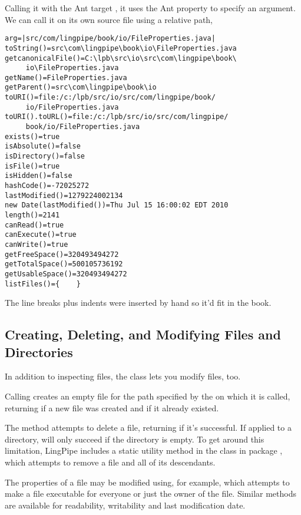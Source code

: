 Calling it with the Ant target , it uses the
 Ant property to specify an argument.  We can call it
on its own source file using a relative path,
%
%
\begin{verbatim}
arg=|src/com/lingpipe/book/io/FileProperties.java|
toString()=src\com\lingpipe\book\io\FileProperties.java
getcanonicalFile()=C:\lpb\src\io\src\com\lingpipe\book\
     io\FileProperties.java
getName()=FileProperties.java
getParent()=src\com\lingpipe\book\io
toURI()=file:/c:/lpb/src/io/src/com/lingpipe/book/
     io/FileProperties.java
toURI().toURL()=file:/c:/lpb/src/io/src/com/lingpipe/
     book/io/FileProperties.java
exists()=true
isAbsolute()=false
isDirectory()=false
isFile()=true
isHidden()=false
hashCode()=-72025272
lastModified()=1279224002134
new Date(lastModified())=Thu Jul 15 16:00:02 EDT 2010
length()=2141
canRead()=true
canExecute()=true
canWrite()=true
getFreeSpace()=320493494272
getTotalSpace()=500105736192
getUsableSpace()=320493494272
listFiles()={    }
\end{verbatim}
%
The line breaks plus indents were inserted by hand so it'd fit in the
book.

\subsection{Creating, Deleting, and Modifying Files and Directories}

In addition to inspecting files, the  class lets you modify
files, too.  

Calling  creates an empty file for the path
specified by the \code{File} on which it is called, returning
 if a new file was created and  if it already
existed.

The  method attempts to delete a file, returning
 if it's successful.  If applied to a directory, 
will only succeed if the directory is empty.  To get around this
limitation, LingPipe includes a static utility method  
in the class \code{File} in package \code{com.aliasi.util}, which attempts
to remove a file and all of its descendants.

The properties of a file may be modified using, for example,
 which attempts to make a file executable
for everyone or just the owner of the file.  Similar methods
are available for readability, writability and last modification date.

